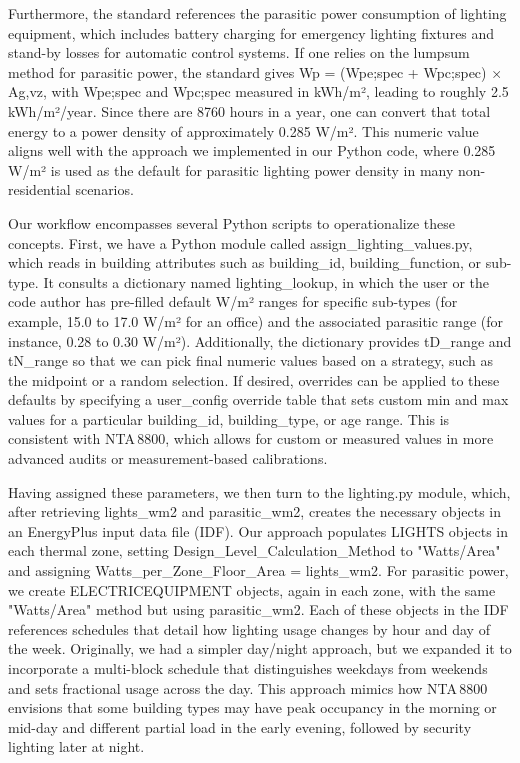 Furthermore, the standard references the parasitic power consumption of lighting equipment, which includes battery charging for emergency lighting fixtures and stand-by losses for automatic control systems. If one relies on the lumpsum method for parasitic power, the standard gives Wp = (Wpe;spec + Wpc;spec) × Ag,vz, with Wpe;spec and Wpc;spec measured in kWh/m², leading to roughly 2.5 kWh/m²/year. Since there are 8760 hours in a year, one can convert that total energy to a power density of approximately 0.285 W/m². This numeric value aligns well with the approach we implemented in our Python code, where 0.285 W/m² is used as the default for parasitic lighting power density in many non-residential scenarios.

Our workflow encompasses several Python scripts to operationalize these concepts. First, we have a Python module called assign_lighting_values.py, which reads in building attributes such as building_id, building_function, or sub-type. It consults a dictionary named lighting_lookup, in which the user or the code author has pre-filled default W/m² ranges for specific sub-types (for example, 15.0 to 17.0 W/m² for an office) and the associated parasitic range (for instance, 0.28 to 0.30 W/m²). Additionally, the dictionary provides tD_range and tN_range so that we can pick final numeric values based on a strategy, such as the midpoint or a random selection. If desired, overrides can be applied to these defaults by specifying a user_config override table that sets custom min and max values for a particular building_id, building_type, or age range. This is consistent with NTA 8800, which allows for custom or measured values in more advanced audits or measurement-based calibrations.

Having assigned these parameters, we then turn to the lighting.py module, which, after retrieving lights_wm2 and parasitic_wm2, creates the necessary objects in an EnergyPlus input data file (IDF). Our approach populates LIGHTS objects in each thermal zone, setting Design_Level_Calculation_Method to "Watts/Area" and assigning Watts_per_Zone_Floor_Area = lights_wm2. For parasitic power, we create ELECTRICEQUIPMENT objects, again in each zone, with the same "Watts/Area" method but using parasitic_wm2. Each of these objects in the IDF references schedules that detail how lighting usage changes by hour and day of the week. Originally, we had a simpler day/night approach, but we expanded it to incorporate a multi-block schedule that distinguishes weekdays from weekends and sets fractional usage across the day. This approach mimics how NTA 8800 envisions that some building types may have peak occupancy in the morning or mid-day and different partial load in the early evening, followed by security lighting later at night.

